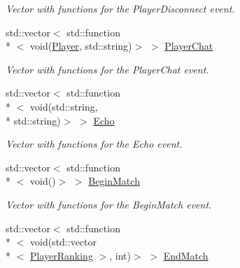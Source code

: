 \begin{DoxyCompactItemize}
\begin{DoxyCompactList}\small\item\em Vector with functions for the Player\-Disconnect event. \end{DoxyCompactList}\item 
\hypertarget{classPlugin_aa88b75d9b344326bc2ea4ac599f2c501}{std\-::vector$<$ std\-::function\\*
$<$ void(\hyperlink{structPlayer}{Player}, std\-::string)$>$ $>$ \hyperlink{classPlugin_aa88b75d9b344326bc2ea4ac599f2c501}{Player\-Chat}}\label{classPlugin_aa88b75d9b344326bc2ea4ac599f2c501}

\begin{DoxyCompactList}\small\item\em Vector with functions for the Player\-Chat event. \end{DoxyCompactList}\item 
\hypertarget{classPlugin_a427a43a87266e448d5543219a9fd26a2}{std\-::vector$<$ std\-::function\\*
$<$ void(std\-::string, \\*
std\-::string)$>$ $>$ \hyperlink{classPlugin_a427a43a87266e448d5543219a9fd26a2}{Echo}}\label{classPlugin_a427a43a87266e448d5543219a9fd26a2}

\begin{DoxyCompactList}\small\item\em Vector with functions for the Echo event. \end{DoxyCompactList}\item 
\hypertarget{classPlugin_a83f8709eb14504c24e44792438fea9f8}{std\-::vector$<$ std\-::function\\*
$<$ void()$>$ $>$ \hyperlink{classPlugin_a83f8709eb14504c24e44792438fea9f8}{Begin\-Match}}\label{classPlugin_a83f8709eb14504c24e44792438fea9f8}

\begin{DoxyCompactList}\small\item\em Vector with functions for the Begin\-Match event. \end{DoxyCompactList}\item 
\hypertarget{classPlugin_a772ce957615c12fd06fdf3190b5c85f5}{std\-::vector$<$ std\-::function\\*
$<$ void(std\-::vector\\*
$<$ \hyperlink{structPlayerRanking}{Player\-Ranking} $>$, int)$>$ $>$ \hyperlink{classPlugin_a772ce957615c12fd06fdf3190b5c85f5}{End\-Match}}\label{classPlugin_a772ce957615c12fd06fdf3190b5c85f5}


\end{DoxyCompactItemize}
